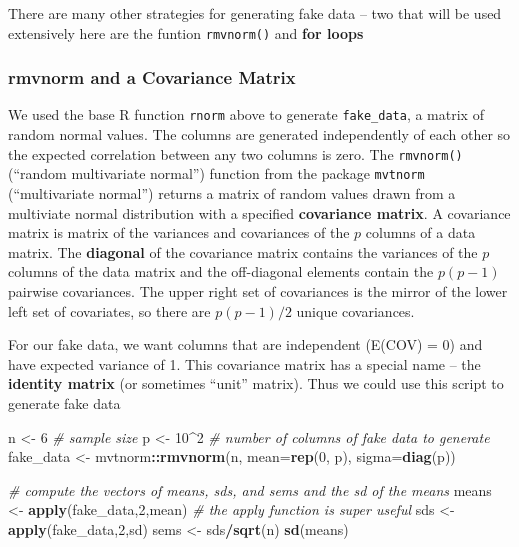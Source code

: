 \documentclass[]{book}
\newenvironment{Shaded}{\begin{snugshade}}{\end{snugshade}}
\newcommand{\KeywordTok}[1]{\textcolor[rgb]{0.13,0.29,0.53}{\textbf{#1}}}
\newcommand{\DataTypeTok}[1]{\textcolor[rgb]{0.13,0.29,0.53}{#1}}
\newcommand{\DecValTok}[1]{\textcolor[rgb]{0.00,0.00,0.81}{#1}}
\newcommand{\StringTok}[1]{\textcolor[rgb]{0.31,0.60,0.02}{#1}}
\newcommand{\CommentTok}[1]{\textcolor[rgb]{0.56,0.35,0.01}{\textit{#1}}}
\newcommand{\OperatorTok}[1]{\textcolor[rgb]{0.81,0.36,0.00}{\textbf{#1}}}
\newcommand{\NormalTok}[1]{#1}
\theoremstyle{definition}
\theoremstyle{definition}
\theoremstyle{definition}
\theoremstyle{remark}
\begin{document}
There are many other strategies for generating fake data -- two that
will be used extensively here are the funtion \texttt{rmvnorm()} and
\textbf{for loops}

\subsubsection{rmvnorm and a Covariance
Matrix}\label{rmvnorm-and-a-covariance-matrix}

We used the base R function \texttt{rnorm} above to generate
\texttt{fake\_data}, a matrix of random normal values. The columns are
generated independently of each other so the expected correlation
between any two columns is zero. The \texttt{rmvnorm()} (``random
multivariate normal'') function from the package \texttt{mvtnorm}
(``multivariate normal'') returns a matrix of random values drawn from a
multiviate normal distribution with a specified \textbf{covariance
matrix}. A covariance matrix is matrix of the variances and covariances
of the \(p\) columns of a data matrix. The \textbf{diagonal} of the
covariance matrix contains the variances of the \(p\) columns of the
data matrix and the off-diagonal elements contain the \(p(p-1)\)
pairwise covariances. The upper right set of covariances is the mirror
of the lower left set of covariates, so there are \(p(p-1)/2\) unique
covariances.

For our fake data, we want columns that are independent (E(COV) = 0) and
have expected variance of 1. This covariance matrix has a special name
-- the \textbf{identity matrix} (or sometimes ``unit'' matrix). Thus we
could use this script to generate fake data

\begin{Shaded}
\begin{Highlighting}[]
\NormalTok{n <-}\StringTok{ }\DecValTok{6} \CommentTok{# sample size}
\NormalTok{p <-}\StringTok{ }\DecValTok{10}\OperatorTok{^}\DecValTok{2} \CommentTok{# number of columns of fake data to generate}
\NormalTok{fake_data <-}\StringTok{  }\NormalTok{mvtnorm}\OperatorTok{::}\KeywordTok{rmvnorm}\NormalTok{(n, }\DataTypeTok{mean=}\KeywordTok{rep}\NormalTok{(}\DecValTok{0}\NormalTok{, p), }\DataTypeTok{sigma=}\KeywordTok{diag}\NormalTok{(p))}

\CommentTok{# compute the vectors of means, sds, and sems and the sd of the means}
\NormalTok{means <-}\StringTok{ }\KeywordTok{apply}\NormalTok{(fake_data,}\DecValTok{2}\NormalTok{,mean) }\CommentTok{# the apply function is super useful}
\NormalTok{sds <-}\StringTok{ }\KeywordTok{apply}\NormalTok{(fake_data,}\DecValTok{2}\NormalTok{,sd)}
\NormalTok{sems <-}\StringTok{ }\NormalTok{sds}\OperatorTok{/}\KeywordTok{sqrt}\NormalTok{(n)}
\KeywordTok{sd}\NormalTok{(means)}
\end{Highlighting}
\end{Shaded}
\end{document}

